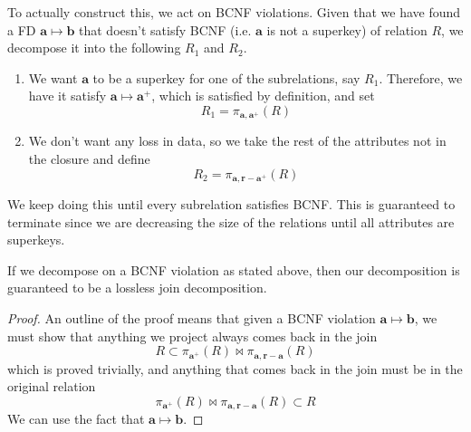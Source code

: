 \documentclass{article}
\begin{document}
    \begin{algo}
      To actually construct this, we act on BCNF violations. Given that we have found a FD $\mathbf{a} \mapsto \mathbf{b}$ that doesn't satisfy BCNF (i.e. $\mathbf{a}$ is not a superkey) of relation $R$, we decompose it into the following $R_1$ and $R_2$. 
      \begin{enumerate}
        \item We want $\mathbf{a}$ to be a superkey for one of the subrelations, say $R_1$. Therefore, we have it satisfy $\mathbf{a} \mapsto \mathbf{a}^+$, which is satisfied by definition, and set 
          \begin{equation}
            R_1 = \pi_{\mathbf{a}, \mathbf{a}^+} (R)
          \end{equation}
        \item We don't want any loss in data, so we take the rest of the attributes not in the closure and define  
          \begin{equation}
            R_2 = \pi_{\mathbf{a}, \mathbf{r} - \mathbf{a}^+} (R)
          \end{equation}
      \end{enumerate}
      We keep doing this until every subrelation satisfies BCNF. This is guaranteed to terminate since we are decreasing the size of the relations until all attributes are superkeys.  
    \end{algo}

    \begin{theorem}
      If we decompose on a BCNF violation as stated above, then our decomposition is guaranteed to be a lossless join decomposition. 
    \end{theorem}
    \begin{proof}
      An outline of the proof means that given a BCNF violation $\mathbf{a} \mapsto \mathbf{b}$, we must show that anything we project always comes back in the join
      \begin{equation}
        R \subset \pi_{\mathbf{a}^+} (R) \bowtie \pi_{\mathbf{a}, \mathbf{r} - \mathbf{a}} (R)
      \end{equation}
      which is proved trivially, and anything that comes back in the join must be in the original relation
      \begin{equation}
        \pi_{\mathbf{a}^+} (R) \bowtie \pi_{\mathbf{a}, \mathbf{r} - \mathbf{a}} (R) \subset R
      \end{equation}
      We can use the fact that $\mathbf{a} \mapsto \mathbf{b}$. 
    \end{proof}
\end{document}
